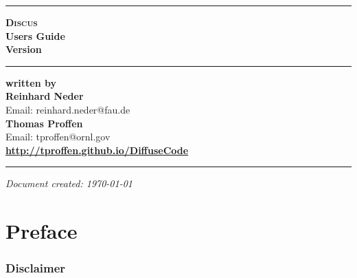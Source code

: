\documentclass[11pt]{report}
\newcommand{\discus}{\textsc{Discus}}
\begin{document}

\begin{titlepage}
\begin{flushright}

  \hrule
  \vspace{15mm}
  \textbf{{ \discus}} \\
  \vspace{15mm}
  \textbf{{ Users Guide}} \\
  \vspace{10mm}
  \textbf{{\Huge Version  \version}} \\
  \vspace{10mm}

  \hrule
  \vspace{40mm}
  \textbf{written by} \\

  \vspace{5mm}
  \textbf{\Large Reinhard Neder} \\
  Email: reinhard.neder@fau.de \\

  \vspace{ 2mm}
  \textbf{\Large Thomas Proffen} \\
  Email: tproffen@ornl.gov \\

  \vspace{12mm}
  \textbf{\Large \url{http://tproffen.github.io/DiffuseCode}} \\

  \vspace{3mm}
  \hrule

\end{flushright}
\begin{flushright}
  \textit{Document created: \today}
\end{flushright}

\end{titlepage}


\chapter*{Preface}
\subsection*{Disclaimer}
\end{document}

